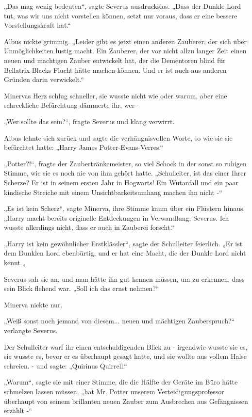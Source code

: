 {„Das mag wenig bedeuten“, sagte Severus ausdruckslos. „Dass der Dunkle Lord tut, was wir uns nicht vorstellen können, setzt nur voraus, dass er eine bessere Vorstellungskraft hat.“

Albus nickte grimmig. „Leider gibt es jetzt einen anderen Zauberer, der sich über Unmöglichkeiten lustig macht. Ein Zauberer, der vor nicht allzu langer Zeit einen neuen und mächtigen Zauber entwickelt hat, der die Dementoren blind für Bellatrix Blacks Flucht hätte machen können. Und er ist auch aus anderen Gründen darin verwickelt.“

Minervas Herz schlug schneller, sie wusste nicht wie oder warum, aber eine schreckliche Befürchtung dämmerte ihr, wer -

„Wer sollte das sein?“, fragte Severus und klang verwirrt.

Albus lehnte sich zurück und sagte die verhängnisvollen Worte, so wie sie sie befürchtet hatte: „Harry James Potter-Evans-Verres.“

„Potter?!“, fragte der Zaubertränkemeister, so viel Schock in der sonst so ruhigen Stimme, wie sie es noch nie von ihm gehört hatte. „Schulleiter, ist das einer Ihrer Scherze? Er ist in seinem ersten Jahr in Hogwarts! Ein Wutanfall und ein paar kindische Streiche mit einem Unsichtbarkeitsumhang machen ihn nicht -“

„Es ist kein Scherz“, sagte Minerva, ihre Stimme kaum über ein Flüstern hinaus. „Harry macht bereits originelle Entdeckungen in Verwandlung, Severus. Ich wusste allerdings nicht, dass er auch in Zauberei forscht.“

„Harry ist kein gewöhnlicher Erstklässler“, sagte der Schulleiter feierlich. „Er ist dem Dunklen Lord ebenbürtig, und er hat eine Macht, die der Dunkle Lord nicht kennt.„

Severus sah sie an, und man hätte ihn gut kennen müssen, um zu erkennen, dass sein Blick flehend war. „Soll ich das ernst nehmen?“

Minerva nickte nur.

„Weiß sonst noch jemand von diesem... neuen und mächtigen Zauberspruch?“ verlangte Severus.

Der Schulleiter warf ihr einen entschuldigenden Blick zu - irgendwie wusste sie es, sie wusste es, bevor er es überhaupt gesagt hatte, und sie wollte aus vollem Halse schreien. - und sagte: „Quirinus Quirrell.“

„Warum“, sagte sie mit einer Stimme, die die Hälfte der Geräte im Büro hätte schmelzen lassen müssen, „hat Mr. Potter unserem Verteidigungsprofessor überhaupt von seinem brillanten neuen Zauber zum Ausbrechen aus Gefängnissen erzählt -“

}
